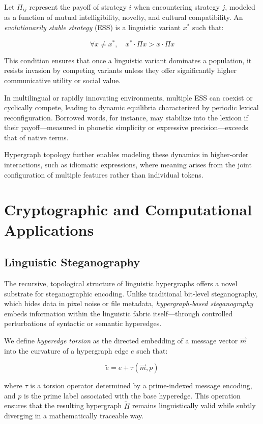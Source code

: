 \documentclass{article}
\theoremstyle{plain}
\theoremstyle{claimstyle}
\begin{document}
Let $\Pi_{ij}$ represent the payoff of strategy $i$ when encountering strategy $j$, modeled as a function of mutual intelligibility, novelty, and cultural compatibility. An \textit{evolutionarily stable strategy} (ESS) is a linguistic variant $x^*$ such that:

\[
\forall x \neq x^*, \quad x^* \cdot \Pi x > x \cdot \Pi x
\]

This condition ensures that once a linguistic variant dominates a population, it resists invasion by competing variants unless they offer significantly higher communicative utility or social value.

In multilingual or rapidly innovating environments, multiple ESS can coexist or cyclically compete, leading to dynamic equilibria characterized by periodic lexical reconfiguration. Borrowed words, for instance, may stabilize into the lexicon if their payoff—measured in phonetic simplicity or expressive precision—exceeds that of native terms.

Hypergraph topology further enables modeling these dynamics in higher-order interactions, such as idiomatic expressions, where meaning arises from the joint configuration of multiple features rather than individual tokens.

\section{Cryptographic and Computational Applications}

\subsection{Linguistic Steganography}

The recursive, topological structure of linguistic hypergraphs offers a novel substrate for steganographic encoding. Unlike traditional bit-level steganography, which hides data in pixel noise or file metadata, \textit{hypergraph-based steganography} embeds information within the linguistic fabric itself—through controlled perturbations of syntactic or semantic hyperedges.

We define \textit{hyperedge torsion} as the directed embedding of a message vector $\vec{m}$ into the curvature of a hypergraph edge $e$ such that:

\[
\widetilde{e} = e + \tau(\vec{m}, p)
\]

where $\tau$ is a torsion operator determined by a prime-indexed message encoding, and $p$ is the prime label associated with the base hyperedge. This operation ensures that the resulting hypergraph $\widetilde{H}$ remains linguistically valid while subtly diverging in a mathematically traceable way.
\end{document}

